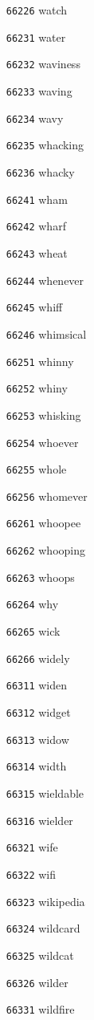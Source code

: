 \documentclass[twoside,11pt]{article}
\begin{document}
\begin{multicols}{5}
\begin{enumerate}
\item[\texttt{66226}] watch
\item[\texttt{66231}] water
\item[\texttt{66232}] waviness
\item[\texttt{66233}] waving
\item[\texttt{66234}] wavy
\item[\texttt{66235}] whacking
\item[\texttt{66236}] whacky
\item[\texttt{66241}] wham
\item[\texttt{66242}] wharf
\item[\texttt{66243}] wheat
\item[\texttt{66244}] whenever
\item[\texttt{66245}] whiff
\item[\texttt{66246}] whimsical
\item[\texttt{66251}] whinny
\item[\texttt{66252}] whiny
\item[\texttt{66253}] whisking
\item[\texttt{66254}] whoever
\item[\texttt{66255}] whole
\item[\texttt{66256}] whomever
\item[\texttt{66261}] whoopee
\item[\texttt{66262}] whooping
\item[\texttt{66263}] whoops
\item[\texttt{66264}] why
\item[\texttt{66265}] wick
\item[\texttt{66266}] widely
\item[\texttt{66311}] widen
\item[\texttt{66312}] widget
\item[\texttt{66313}] widow
\item[\texttt{66314}] width
\item[\texttt{66315}] wieldable
\item[\texttt{66316}] wielder
\item[\texttt{66321}] wife
\item[\texttt{66322}] wifi
\item[\texttt{66323}] wikipedia
\item[\texttt{66324}] wildcard
\item[\texttt{66325}] wildcat
\item[\texttt{66326}] wilder
\item[\texttt{66331}] wildfire

\end{enumerate}
\end{multicols}
\end{document}
